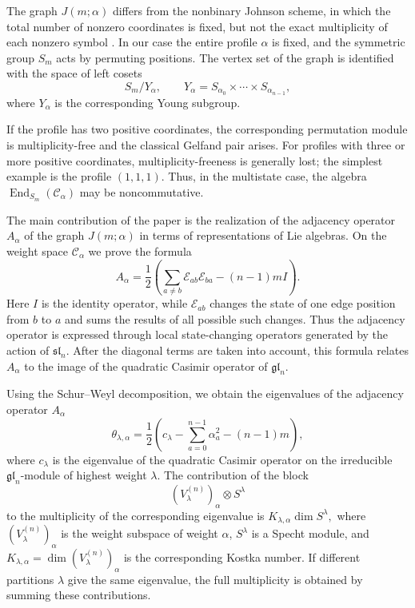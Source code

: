 \documentclass[12pt,reqno]{amsart}
\newcommand{\End}{\operatorname{End}}
\begin{document}
The graph $J(m;\alpha)$ differs from the nonbinary Johnson scheme, in
which the total number of nonzero coordinates is fixed, but not the exact
multiplicity of each nonzero symbol
\cite{TarnanenAaltonenGoethals1985}. In our case the entire profile
$\alpha$ is fixed, and the symmetric group $S_m$ acts by permuting
positions. The vertex set of the graph is identified with the space of
left cosets
$$
S_m/Y_\alpha,
\qquad
Y_\alpha
=
S_{\alpha_0}\times\cdots\times S_{\alpha_{n-1}},
$$
where $Y_\alpha$ is the corresponding Young subgroup.

If the profile has two positive coordinates, the corresponding permutation
module is multiplicity-free and the classical Gelfand pair arises. For
profiles with three or more positive coordinates, multiplicity-freeness is
generally lost; the simplest example is the profile $(1,1,1)$. Thus, in
the multistate case, the algebra
$
\End_{S_m}(\mathcal C_\alpha)
$
may be noncommutative.

The main contribution of the paper is the realization of the adjacency
operator $A_\alpha$ of the graph $J(m;\alpha)$ in terms of representations
of Lie algebras. On the weight space $\mathcal C_\alpha$ we prove the
formula
$$
A_\alpha
=
\frac12
\left(
\sum_{a\ne b}\mathcal E_{ab}\mathcal E_{ba}
-
(n-1)mI
\right).
$$
Here $I$ is the identity operator, while $\mathcal E_{ab}$ changes the
state of one edge position from $b$ to $a$ and sums the results of all
possible such changes.
Thus the adjacency operator is expressed through local state-changing
operators generated by the action of $\mathfrak{sl}_n$. After the diagonal
terms are taken into account, this formula relates $A_\alpha$ to the image
of the quadratic Casimir operator of $\mathfrak{gl}_n$.

Using the Schur--Weyl decomposition, we obtain the eigenvalues of the
adjacency operator $A_\alpha$
$$
\theta_{\lambda,\alpha}
=
\frac12
\left(
c_\lambda
-
\sum_{a=0}^{n-1}\alpha_a^2
-
(n-1)m
\right),
$$
where $c_\lambda$ is the eigenvalue of the quadratic Casimir operator on
the irreducible $\mathfrak{gl}_n$-module of highest weight $\lambda$. The
contribution of the block
$$
(V_\lambda^{(n)})_\alpha\otimes S^\lambda
$$
to the multiplicity of the corresponding eigenvalue is
$
K_{\lambda,\alpha}\dim S^\lambda,
$
where $(V_\lambda^{(n)})_\alpha$ is the weight subspace of weight
$\alpha$, $S^\lambda$ is a Specht module, and
$K_{\lambda,\alpha}=\dim (V_\lambda^{(n)})_\alpha$ is the corresponding
Kostka number.
If different partitions $\lambda$ give the same eigenvalue, the full
multiplicity is obtained by summing these contributions.
\end{document}
